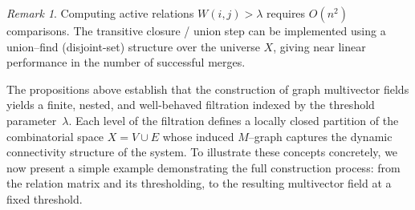 \documentclass{article}
\theoremstyle{definition}
\theoremstyle{plain}
\theoremstyle{remark}
\newtheorem{remark}{Remark}
\newcommand{\1}{\mathbbm{1}}  %
\begin{document}
\begin{remark}
\label{rem:complexity-lc}
Computing active relations \(W(i,j)>\lambda\) requires \(O(n^2)\)
comparisons. The transitive closure / union step can be implemented using
a union–find (disjoint-set) structure over the universe \(X\), giving near
linear performance in the number of successful merges.
\end{remark}




\medskip
The propositions above establish that the construction of
graph multivector fields yields a finite, nested, and well-behaved
filtration indexed by the threshold parameter~$\lambda$.
Each level of the filtration defines a locally closed partition of the
combinatorial space \( X = V \cup E \) whose induced
$M$--graph captures the dynamic connectivity structure of the system.
To illustrate these concepts concretely, we now present a simple
example demonstrating the full construction process:
from the relation matrix and its thresholding,
to the resulting multivector field at a fixed threshold.
\end{document}
